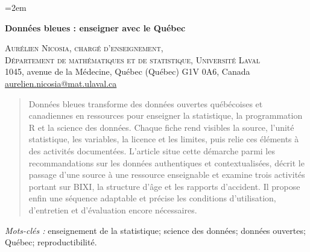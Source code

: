 \documentclass[10pt]{article}
\begin{document}
\renewcommand{\tablename}{\textsc{Tableau}}
\emergencystretch=2em

\begin{center}
\textsf{\LARGE \textbf{Données bleues : enseigner avec le Québec}}
\end{center}

\begin{flushright}
\textsc{Aurélien Nicosia, chargé d'enseignement,\\
Département de mathématiques et de statistique, Université Laval}\\
1045, avenue de la Médecine, Québec (Québec) G1V 0A6, Canada\\
\href{mailto:aurelien.nicosia@mat.ulaval.ca}{aurelien.nicosia@mat.ulaval.ca}
\end{flushright}

\baselineskip

\begin{abstract}
Données bleues transforme des données ouvertes québécoises et canadiennes en ressources pour enseigner la statistique, la programmation R et la science des données. Chaque fiche rend visibles la source, l'unité statistique, les variables, la licence et les limites, puis relie ces éléments à des activités documentées. L'article situe cette démarche parmi les recommandations sur les données authentiques et contextualisées, décrit le passage d'une source à une ressource enseignable et examine trois activités portant sur BIXI, la structure d'âge et les rapports d'accident. Il propose enfin une séquence adaptable et précise les conditions d'utilisation, d'entretien et d'évaluation encore nécessaires.
\end{abstract}

\noindent\textit{Mots-clés :} enseignement de la statistique; science des données; données ouvertes; Québec; reproductibilité.


\end{document}
